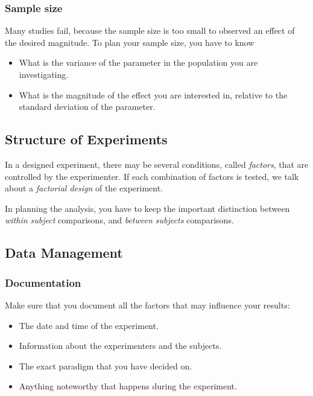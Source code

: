 \subsubsection{Sample size}
Many studies fail, because the sample size is too small to observed an effect of the desired magnitude. To plan your sample size, you have to know
\begin{itemize}
  \item What is the variance of the parameter in the population you are investigating.
  \item What is the magnitude of the effect you are interested in, relative to the standard deviation of the parameter.
\end{itemize}

\subsection{Structure of Experiments}

In a designed experiment, there may be several conditions, called \emph{factors}, that are controlled by the experimenter. If each combination of factors is tested, we talk about a \emph{factorial design} of the experiment.

In planning the analysis, you have to keep the important distinction between \emph{within subject} comparisons, and \emph{between subjects} comparisons.


\subsection{Data Management}

\subsubsection{Documentation} 
Make sure that you document all the factors that may influence your results:

\begin{itemize}
  \item The date and time of the experiment.
  \item Information about the experimenters and the subjects.
  \item The exact paradigm that you have decided on.
  \item Anything noteworthy that happens during the experiment.
\end{itemize}

